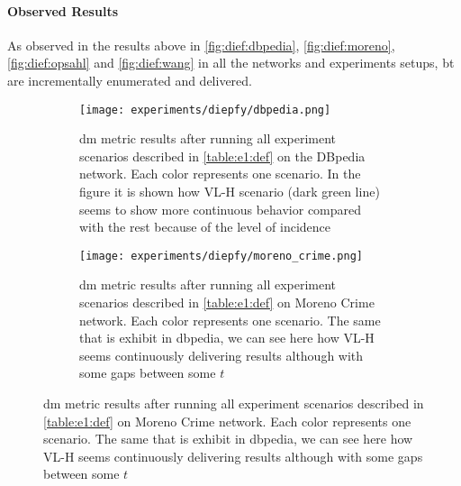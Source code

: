  \paragraph{Observed Results}\label{sub:sec:res:e1}
 As observed in the results above in \autoref{fig:dief:dbpedia}, \autoref{fig:dief:moreno}, \autoref{fig:dief:opsahl} and \autoref{fig:dief:wang} in all the networks and experiments setups, \acrshort{bt} are incrementally enumerated and delivered. 

 \begin{figure}[!htp]
  \centering
  \begin{subfigure}[t]{0.45\textwidth}
   \texttt{[image: experiments/diepfy/dbpedia.png]}
    \caption[{[EE] \acrshort{dm} Results: \acrshort{dbpedia}}]{\acrshort{dm} metric results after running all experiment scenarios described in \autoref{table:e1:def} on the DBpedia network. Each color represents one scenario. In the figure it is shown how VL-H scenario (dark green line) seems to show more continuous behavior compared with the rest because of the level of incidence}
    \label{fig:dief:dbpedia}
  \end{subfigure}\hfill
  \begin{subfigure}[t]{0.45\textwidth}
   \texttt{[image: experiments/diepfy/moreno\_crime.png]}
    \caption[{[EE] \acrshort{dm} Results: Moreno Crime}]{\acrshort{dm} metric results after running all experiment scenarios described in \autoref{table:e1:def} on Moreno Crime network. Each color represents one scenario. The same that is exhibit in dbpedia, we can see here how VL-H seems continuously delivering results although with some gaps between some $t$}
    \label{fig:dief:moreno}
  \end{subfigure}
  \vspace{0.5cm}


\end{figure}
